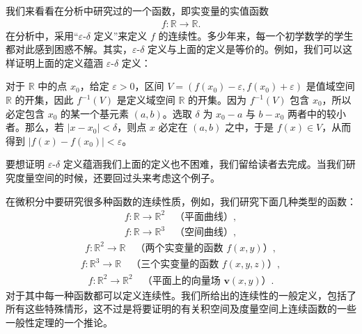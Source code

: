 \documentclass[../../main.tex]{subfiles}
\begin{document}
\begin{example}\label{example:ch02-eps-delta}
我们来看看在分析中研究过的一个函数，即实变量的实值函数
\begin{align*}
f: \mathbb{R} \longrightarrow \mathbb{R}.
\end{align*}
在分析中，采用“$\varepsilon$-$\delta$ 定义”来定义 $f$ 的连续性。多少年来，每一个初学数学的学生都对此感到困惑不解。其实，$\varepsilon$-$\delta$ 定义与上面的定义是等价的。例如，我们可以这样证明上面的定义蕴涵 $\varepsilon$-$\delta$ 定义：

对于 $\mathbb{R}$ 中的点 $x_{0}$，给定 $\varepsilon > 0$，区间 $V = (f(x_{0}) - \varepsilon, f(x_{0}) + \varepsilon)$ 是值域空间 $\mathbb{R}$ 的开集，因此 $f^{-1}(V)$ 是定义域空间 $\mathbb{R}$ 的开集。因为 $f^{-1}(V)$ 包含 $x_{0}$，所以必定包含 $x_{0}$ 的某一个基元素 $(a, b)$。选取 $\delta$ 为 $x_{0} - a$ 与 $b - x_{0}$ 两者中的较小者。那么，若 $|x - x_{0}| < \delta$，则点 $x$ 必定在 $(a, b)$ 之中，于是 $f(x) \in V$，从而得到 $|f(x) - f(x_{0})| < \varepsilon$。

要想证明 $\varepsilon$-$\delta$ 定义蕴涵我们上面的定义也不困难，我们留给读者去完成。当我们研究度量空间的时候，还要回过头来考虑这个例子。
\end{example}

\begin{example}\label{example:ch02-微积分函数}
在微积分中要研究很多种函数的连续性质，例如，我们研究下面几种类型的函数：
\begin{align*}
f: \mathbb{R} \longrightarrow \mathbb{R}^{2} \quad \text{（平面曲线）},
\end{align*}
\begin{align*}
f: \mathbb{R} \longrightarrow \mathbb{R}^{3} \quad \text{（空间曲线）},
\end{align*}
\begin{align*}
f: \mathbb{R}^{2} \longrightarrow \mathbb{R} \quad \text{（两个实变量的函数 } f(x, y)\text{）},
\end{align*}
\begin{align*}
f: \mathbb{R}^{3} \longrightarrow \mathbb{R} \quad \text{（三个实变量的函数 } f(x, y, z)\text{）},
\end{align*}
\begin{align*}
f: \mathbb{R}^{2} \longrightarrow \mathbb{R}^{2} \quad \text{（平面上的向量场 } \bm{v}(x, y)\text{）}.
\end{align*}
对于其中每一种函数都可以定义连续性。我们所给出的连续性的一般定义，包括了所有这些特殊情形，这不过是将要证明的有关积空间及度量空间上连续函数的一些一般性定理的一个推论。
\end{example}
\end{document}
